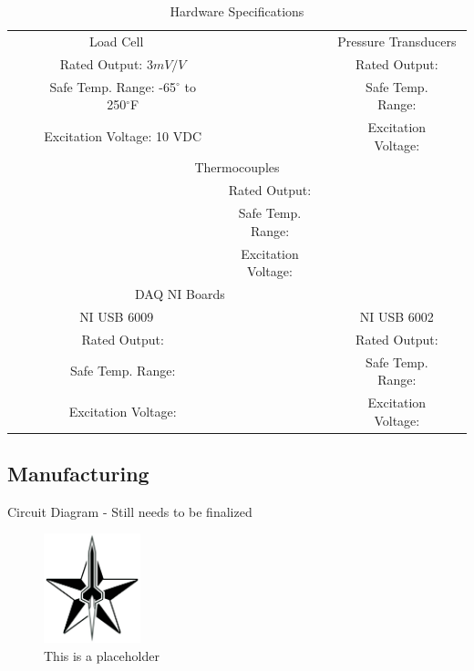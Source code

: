 \documentclass[10pt,a4paper]{article}
\begin{document}
\newcommand{\ra}[1]{\renewcommand{\arraystretch}{#1}}
\begin{table}\centering
	\ra{1.3}
	\begin{tabular}{@{}ccccccc@{}}\toprule
		& \multicolumn{2}{c}{Load Cell} & \phantom{abc}& \multicolumn{3}{c}{Pressure Transducers}\\
		\cmidrule{1-3} \cmidrule{4-6}
		 &&Rated Output: $3mV/V$ &&& Rated Output: \\ &&Safe Temp. Range: -65$^{\circ}$ to 250$^{\circ}$F &&& Safe Temp. Range: \\ &&Excitation Voltage: 10 VDC &&& Excitation Voltage: \\ \midrule
		& \multicolumn{5}{c}{Thermocouples}\\
		\cmidrule{4-5}
		&&& Rated Output: \\ &&& Safe Temp. Range:\\ &&& Excitation Voltage: \\  \midrule \midrule
		& \multicolumn{4}{c}{DAQ NI Boards}\\ \midrule
		& \multicolumn{2}{c}{NI USB 6009} & \phantom{abc}& \multicolumn{3}{c}{NI USB 6002}\\
		\cmidrule{1-3} \cmidrule{4-6}
		&&Rated Output:&&& Rated Output: \\ &&Safe Temp. Range:  &&& Safe Temp. Range: \\ &&Excitation Voltage: &&& Excitation Voltage: \\
		\bottomrule
	\end{tabular}
	\caption{Hardware Specifications}
\end{table}


\subsection{Manufacturing}

Circuit Diagram - Still needs to be finalized 
\begin{figure}[h!]
	\centering
	\includegraphics[width=0.25\textwidth]{./figs/logo_srt.png}
	\caption{This is a placeholder}
	\label{fig:This is a placeholder}
\end{figure}
\newpage
\end{document}
